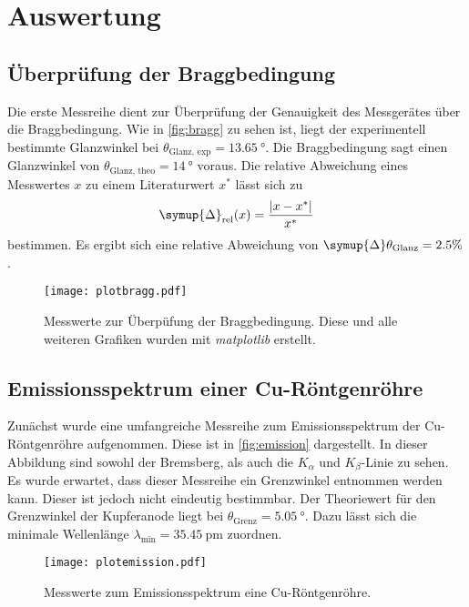 \section{Auswertung}
\label{sec:Auswertung}
\subsection{Überprüfung der Braggbedingung}
\label{subsec:bragg}
Die erste Messreihe dient zur Überprüfung der Genauigkeit des Messgerätes über die Braggbedingung. Wie in 
\autoref{fig:bragg} zu sehen ist, liegt der experimentell bestimmte Glanzwinkel bei $\theta_\text{Glanz, exp} = \qty{13.65}{\degree}$. Die Braggbedingung sagt einen 
Glanzwinkel von $\theta_\text{Glanz, theo} = \qty{14}{\degree}$ voraus.
Die relative Abweichung eines Messwertes $x$ zu einem Literaturwert $x^*$ lässt sich zu 
\begin{equation}
  \label{eqn:Delta_rel}
  \symup{\Delta}_\text{rel}(x) = \frac{|x - x^*|}{x^*}
\end{equation}
bestimmen.
Es ergibt sich eine relative Abweichung von $\symup{\Delta} \theta_\text{Glanz} = 2.5\%$.
\begin{figure}
    \centering
    \texttt{[image: plotbragg.pdf]}
    \caption{Messwerte zur Überpüfung der Braggbedingung. Diese und alle weiteren Grafiken wurden mit \textit{matplotlib} \cite{matplotlib} erstellt.}
    \label{fig:bragg}
\end{figure}

\subsection{Emissionsspektrum einer Cu-Röntgenröhre}
\label{subsec:emission}
Zunächst wurde eine umfangreiche Messreihe zum Emissionsspektrum der Cu-Röntgenröhre aufgenommen. Diese ist in \autoref{fig:emission} dargestellt. In dieser Abbildung sind
sowohl der Bremsberg, als auch die $K_{\alpha}$ und $K_{\beta}$-Linie zu sehen. Es wurde erwartet, dass dieser Messreihe ein Grenzwinkel entnommen werden kann. 
Dieser ist jedoch nicht eindeutig bestimmbar. Der Theoriewert für den Grenzwinkel der Kupferanode liegt bei $\theta_{\text{Grenz}} = \qty{5.05}{\degree}$.
Dazu lässt sich die minimale Wellenlänge $\lambda_{\text{min}} = \qty{35.45}{\pico\metre}$ zuordnen. 

\begin{figure}
    \centering
    \texttt{[image: plotemission.pdf]}
    \caption{Messwerte zum Emissionsspektrum eine Cu-Röntgenröhre.}
    \label{fig:emission}
  \end{figure}

